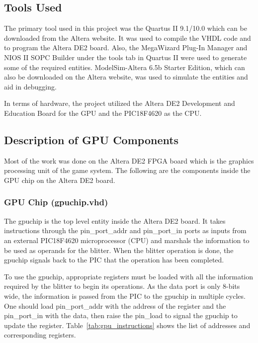 \documentclass{report}
\begin{document}
\subsection{Tools Used}
The primary tool used in this project was the Quartus II 9.1/10.0 which 
can be downloaded from the Altera website. It was used to compile the VHDL 
code and to program the Altera DE2 board. Also, the MegaWizard Plug-In 
Manager and NIOS II SOPC Builder under the tools tab in Quartus II were 
used to generate some of the required entities. ModelSim-Altera 6.5b 
Starter Edition, which can also be downloaded on the Altera website, was 
used to simulate the entities and aid in debugging.

In terms of hardware, the project utilized the Altera DE2 Development 
and Education Board for the GPU and the PIC18F4620 as the CPU.

\subsection{Description of GPU Components}
Most of the work was done on the Altera DE2 FPGA board which is the 
graphics processing unit of the game system. The following are the 
components inside the GPU chip on the Altera DE2 board.

\subsubsection{GPU Chip (gpuchip.vhd)}
The gpuchip is the top level entity inside the Altera DE2 board. It 
takes instructions through the pin\_port\_addr and pin\_port\_in ports
as inputs from an external PIC18F4620 microprocessor (CPU) and marshals
the information to be used as operands for the blitter. When the blitter
operation is done, the gpuchip signals back to the PIC that the
operation has been completed.

To use the gpuchip, appropriate registers must be loaded with all the information 
required by the blitter to begin its operations. As the data port is only 8-bits wide,
the information is passed from the PIC to the gpuchip in multiple cycles. One should
load pin\_port\_addr with the address of the register and the 
pin\_port\_in with the data, then raise the pin\_load to signal the
gpuchip to update the register. Table~\ref{tab:gpu_instructions}
 shows the list of addresses and corresponding registers.
\end{document}
